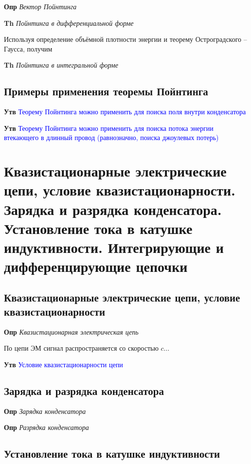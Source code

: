 \documentclass[a4paper, 14pt]{article}
\begin{document}
    \textbf{Опр} \textit{Вектор Пойнтинга}
    
    \textbf{Th} \textit{Пойнтинга в дифференциальной форме}
    
    Используя определение объёмной плотности энергии и теорему Остроградского -- Гаусса, получим
    
    \textbf{Th} \textit{Пойнтинга в интегральной форме}
    
    \subsection{Примеры применения теоремы Пойнтинга}
    
    \textbf{Утв} \textcolor{blue}{Теорему Пойнтинга можно применить для поиска поля внутри конденсатора}
    
    \textbf{Утв} \textcolor{blue}{Теорему Пойнтинга можно применить для поиска потока энергии втекающего в
    длинный провод (равнозначно, поиска джоулевых потерь)}
    
    \section{Квазистационарные электрические цепи, условие квазистационарности.
    Зарядка и разрядка конденсатора.
    Установление тока в катушке индуктивности.
    Интегрирующие и дифференцирующие цепочки}
    
    \subsection{Квазистационарные электрические цепи, условие квазистационарности}
    
    \textbf{Опр} \textit{Квазистационарная электрическая цепь}
    
    По цепи ЭМ сигнал распространяется со скоростью $c \ldots$
    
    \textbf{Утв} \textcolor{blue}{Условие квазистационарности цепи}
    
    \subsection{Зарядка и разрядка конденсатора}
    
    \textbf{Опр} \textit{Зарядка конденсатора}
    
    \textbf{Опр} \textit{Разрядка конденсатора}
    
    \subsection{Установление тока в катушке индуктивности}
    
\end{document}
